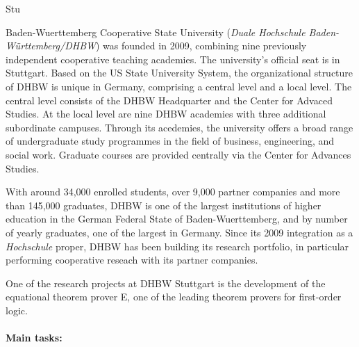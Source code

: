 \begin{sitedescription}{Stu}





Baden-Wuerttemberg Cooperative State University (\emph{Duale
  Hochschule Baden-Württemberg/DHBW}) was founded in 2009, combining
nine previously independent cooperative teaching academies. The
university's official seat is in Stuttgart. Based on the US State
University System, the organizational structure of DHBW is unique in
Germany, comprising a central level and a local level. The central
level consists of the DHBW Headquarter and the Center for Advaced
Studies. At the local level are nine DHBW academies with three
additional subordinate campuses. Through its acedemies, the university
offers a broad range of undergraduate study programmes in the field of
business, engineering, and social work. Graduate courses are provided
centrally via the Center for Advances Studies.


With around 34,000 enrolled students, over 9,000 partner companies and
more than 145,000 graduates, DHBW is one of the largest institutions
of higher education in the German Federal State of Baden-Wuerttemberg,
and by number of yearly graduates, one of the largest in Germany.
Since its 2009 integration as a \emph{Hochschule} proper, DHBW has
been building its research portfolio, in particular performing
cooperative reseach with its partner companies.

One of the research projects at DHBW Stuttgart is the development of
the equational theorem prover E, one of the leading theorem provers
for first-order logic.


\paragraph*{Main tasks:}


\end{sitedescription}
